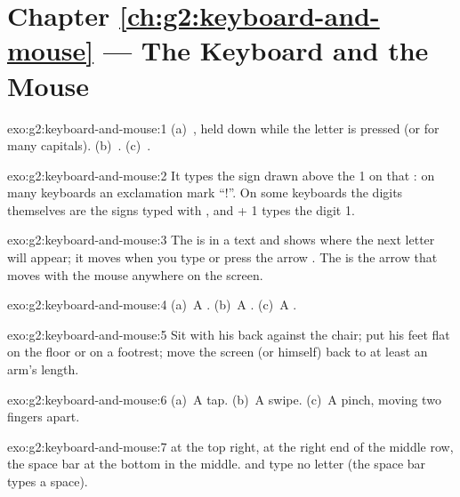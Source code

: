 \section*{Chapter \ref{ch:g2:keyboard-and-mouse} --- The Keyboard and the Mouse}

\begin{solution}{exo:g2:keyboard-and-mouse:1}
(a)~, held down while the letter  is pressed (or 
for many capitals). (b)~. (c)~.
\end{solution}

\begin{solution}{exo:g2:keyboard-and-mouse:2}
It types the sign drawn above the 1 on that : on many keyboards an
exclamation mark ``!''. On some keyboards the digits themselves are the signs
typed with , and  + 1 types the digit 1.
\end{solution}

\begin{solution}{exo:g2:keyboard-and-mouse:3}
The  is in a text and shows where the next letter will appear; it moves
when you type or press the arrow . The  is the arrow that moves
with the mouse anywhere on the screen.
\end{solution}

\begin{solution}{exo:g2:keyboard-and-mouse:4}
(a)~A . (b)~A . (c)~A .
\end{solution}

\begin{solution}{exo:g2:keyboard-and-mouse:5}
Sit with his back against the chair; put his feet flat on the floor or on a
footrest; move the screen (or himself) back to at least an arm's length.
\end{solution}

\begin{solution}{exo:g2:keyboard-and-mouse:6}
(a)~A tap. (b)~A swipe. (c)~A pinch, moving two fingers apart.
\end{solution}

\begin{solution}{exo:g2:keyboard-and-mouse:7}
 at the top right,  at the right end of the middle
row, the space bar at the bottom in the middle.  and 
type no letter (the space bar types a space).
\end{solution}

